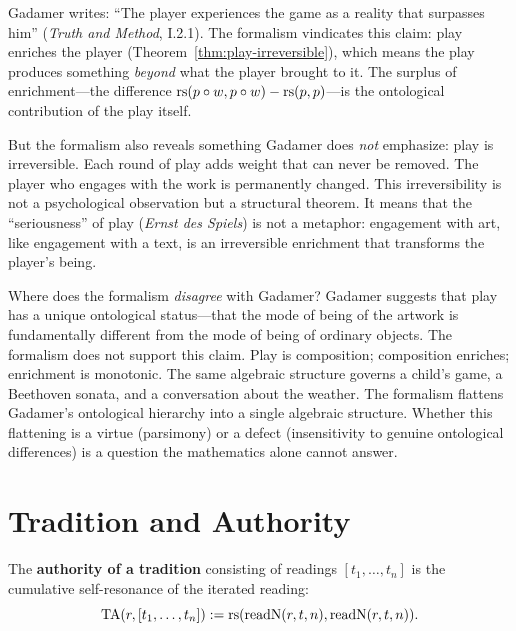 \begin{interpretation}
\label{interp:gadamer-play}
Gadamer writes: ``The player experiences the game as a reality that surpasses
him'' (\textit{Truth and Method}, I.2.1). The formalism vindicates this claim:
play enriches the player (Theorem~\ref{thm:play-irreversible}), which means
the play produces something \emph{beyond} what the player brought to it. The
surplus of enrichment---the difference $\mathrm{rs}(p \circ w, p \circ w) - \mathrm{rs}(p, p)$---is
the ontological contribution of the play itself.

But the formalism also reveals something Gadamer does \emph{not} emphasize:
play is irreversible. Each round of play adds weight that can never be
removed. The player who engages with the work is permanently changed. This
irreversibility is not a psychological observation but a structural theorem.
It means that the ``seriousness'' of play (\textit{Ernst des Spiels}) is not
a metaphor: engagement with art, like engagement with a text, is an
irreversible enrichment that transforms the player's being.

Where does the formalism \emph{disagree} with Gadamer? Gadamer suggests that
play has a unique ontological status---that the mode of being of the artwork
is fundamentally different from the mode of being of ordinary objects. The
formalism does not support this claim. Play is composition; composition
enriches; enrichment is monotonic. The same algebraic structure governs a
child's game, a Beethoven sonata, and a conversation about the weather. The
formalism flattens Gadamer's ontological hierarchy into a single algebraic
structure. Whether this flattening is a virtue (parsimony) or a defect
(insensitivity to genuine ontological differences) is a question the
mathematics alone cannot answer.
\end{interpretation}

\section{Tradition and Authority}

\begin{definition}
\label{def:tradition-authority}
The \textbf{authority of a tradition} consisting of readings $[t_1, \ldots, t_n]$
is the cumulative self-resonance of the iterated reading:
\[
\mathrm{TA}(r, [t_1, \ldots, t_n]) := \mathrm{rs}(\mathrm{readN}(r, t, n), \mathrm{readN}(r, t, n)).
\]
\end{definition}

